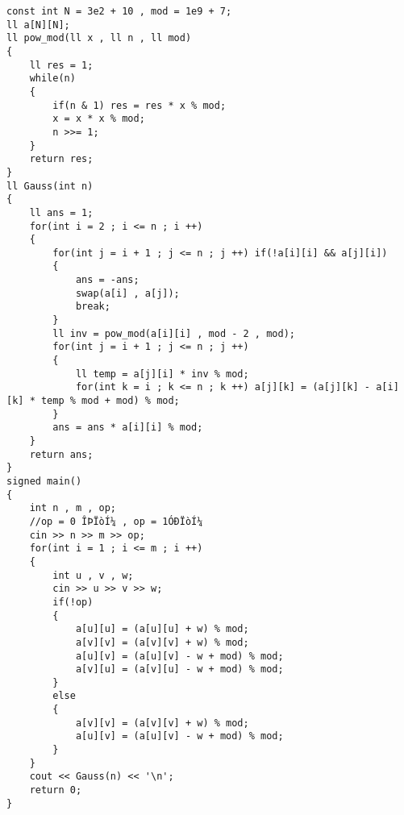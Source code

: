 \documentclass[E:/GsjzTle/main/main.tex]{subfiles}
\begin{document}
\begin{lstlisting}
const int N = 3e2 + 10 , mod = 1e9 + 7;
ll a[N][N];
ll pow_mod(ll x , ll n , ll mod)
{
	ll res = 1;
	while(n)
	{
		if(n & 1) res = res * x % mod;
		x = x * x % mod;
		n >>= 1;
	}
	return res;
}
ll Gauss(int n)
{
	ll ans = 1;
	for(int i = 2 ; i <= n ; i ++)
	{
		for(int j = i + 1 ; j <= n ; j ++) if(!a[i][i] && a[j][i])
		{
			ans = -ans;
			swap(a[i] , a[j]);
			break;
		}
		ll inv = pow_mod(a[i][i] , mod - 2 , mod);
		for(int j = i + 1 ; j <= n ; j ++)
		{
			ll temp = a[j][i] * inv % mod;
			for(int k = i ; k <= n ; k ++) a[j][k] = (a[j][k] - a[i][k] * temp % mod + mod) % mod;
		}
		ans = ans * a[i][i] % mod;
	}
	return ans;
}
signed main()
{
	int n , m , op;
	//op = 0 ÎÞÏòÍ¼ , op = 1ÓÐÏòÍ¼ 
	cin >> n >> m >> op;
	for(int i = 1 ; i <= m ; i ++)
	{
		int u , v , w;
		cin >> u >> v >> w;
		if(!op)
		{
			a[u][u] = (a[u][u] + w) % mod;
			a[v][v] = (a[v][v] + w) % mod;
			a[u][v] = (a[u][v] - w + mod) % mod;
			a[v][u] = (a[v][u] - w + mod) % mod;
		}
		else
		{
			a[v][v] = (a[v][v] + w) % mod;
			a[u][v] = (a[u][v] - w + mod) % mod;
		}
	}
	cout << Gauss(n) << '\n';
	return 0;
}
\end{lstlisting}
\end{document}
